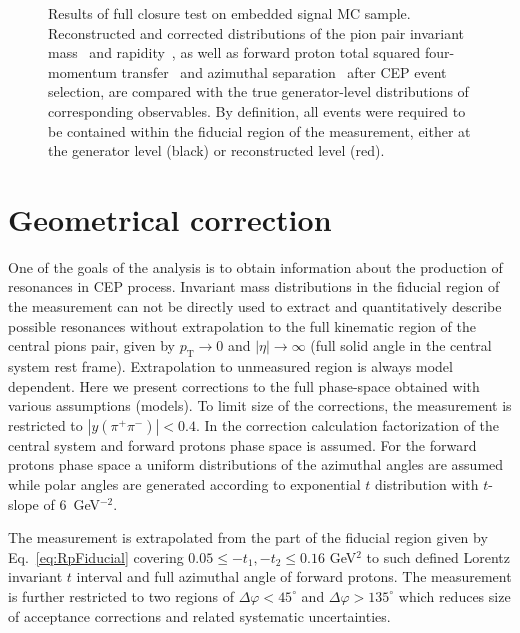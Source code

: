 \begin{figure}[h]
{\begin{subfigure}[b]{\linewidth}
  \end{subfigure}
}%
\caption[Results of full closure test on embedded signal MC sample.]{Results of full closure test on embedded signal MC sample. Reconstructed and corrected distributions of the pion pair invariant mass~ and rapidity~, as well as forward proton total squared four-momentum transfer~ and azimuthal separation~ after CEP event selection, are compared with the true generator-level distributions of corresponding observables. By definition, all events were required to be contained within the fiducial region of the measurement, either at the generator level (black) or reconstructed level (red).}\label{fig:closureTestFull}%
\end{figure}


\section{Geometrical correction}\label{sec:geomCorr}


One of the goals of the analysis is to obtain information about the production of resonances in CEP process. Invariant mass distributions in the fiducial region of the measurement can not be directly used to extract and quantitatively describe possible resonances without extrapolation to the full kinematic region of the central pions pair, given by $p_\mathrm{T}\rightarrow 0$ and $|\eta|\rightarrow\infty$  (full solid angle in the central system rest frame). Extrapolation to unmeasured region is always model dependent. Here we present corrections to the full phase-space obtained with various assumptions (models). To limit size of the corrections, the measurement is restricted to $|y(\pi^+\pi^-)|<0.4$. In the correction calculation factorization of the central system and forward protons phase space is assumed. For the forward protons phase space a uniform distributions of the azimuthal angles are assumed while polar angles are generated according to exponential $t$ distribution with $t$-slope of 6~GeV$^{-2}$.

The measurement is extrapolated from the part of the fiducial region given by Eq.~\eqref{eq:RpFiducial} covering $0.05 \leq -t_1 , -t_2 \leq 0.16$ GeV$^2$ to such defined Lorentz invariant $t$ interval and full azimuthal angle of forward protons.
The measurement is further restricted to two regions of $\Delta\varphi<45^\circ$ and $\Delta\varphi>135^\circ$ which reduces size of acceptance corrections and related systematic uncertainties.

